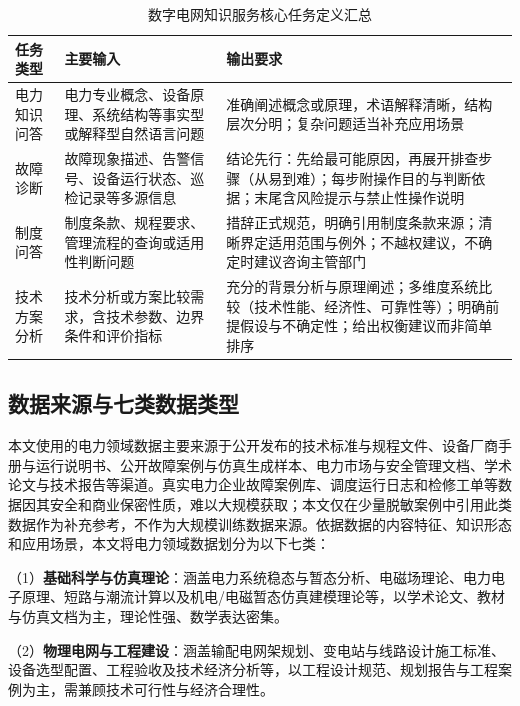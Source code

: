 \documentclass[fontset=fandol,type=master,campus=shenzhen,etitleauto=true]{hithesisbook}
\begin{document}
\begin{table}[htbp]
\centering
\caption{数字电网知识服务核心任务定义汇总}
\label{tab:task-def}
\small
\begin{tabular}{p{2.5cm}p{4.5cm}p{6.0cm}}
\toprule
\textbf{任务类型} & \textbf{主要输入} & \textbf{输出要求} \\
\midrule
电力知识问答 & 电力专业概念、设备原理、系统结构等事实型或解释型自然语言问题 & 准确阐述概念或原理，术语解释清晰，结构层次分明；复杂问题适当补充应用场景 \\
\addlinespace
故障诊断 & 故障现象描述、告警信号、设备运行状态、巡检记录等多源信息 & 结论先行：先给最可能原因，再展开排查步骤（从易到难）；每步附操作目的与判断依据；末尾含风险提示与禁止性操作说明 \\
\addlinespace
制度问答 & 制度条款、规程要求、管理流程的查询或适用性判断问题 & 措辞正式规范，明确引用制度条款来源；清晰界定适用范围与例外；不越权建议，不确定时建议咨询主管部门 \\
\addlinespace
技术方案分析 & 技术分析或方案比较需求，含技术参数、边界条件和评价指标 & 充分的背景分析与原理阐述；多维度系统比较（技术性能、经济性、可靠性等）；明确前提假设与不确定性；给出权衡建议而非简单排序 \\
\bottomrule
\end{tabular}
\end{table}

\subsection{数据来源与七类数据类型}\label{ux6570ux636eux6765ux6e90ux4e0eux4e03ux7c7bux6570ux636eux7c7bux578b}

本文使用的电力领域数据主要来源于公开发布的技术标准与规程文件、设备厂商手册与运行说明书、公开故障案例与仿真生成样本、电力市场与安全管理文档、学术论文与技术报告等渠道。真实电力企业故障案例库、调度运行日志和检修工单等数据因其安全和商业保密性质，难以大规模获取；本文仅在少量脱敏案例中引用此类数据作为补充参考，不作为大规模训练数据来源。依据数据的内容特征、知识形态和应用场景，本文将电力领域数据划分为以下七类：

\noindent （1）\textbf{基础科学与仿真理论}：涵盖电力系统稳态与暂态分析、电磁场理论、电力电子原理、短路与潮流计算以及机电/电磁暂态仿真建模理论等，以学术论文、教材与仿真文档为主，理论性强、数学表达密集。

\noindent （2）\textbf{物理电网与工程建设}：涵盖输配电网架规划、变电站与线路设计施工标准、设备选型配置、工程验收及技术经济分析等，以工程设计规范、规划报告与工程案例为主，需兼顾技术可行性与经济合理性。
\end{document}
